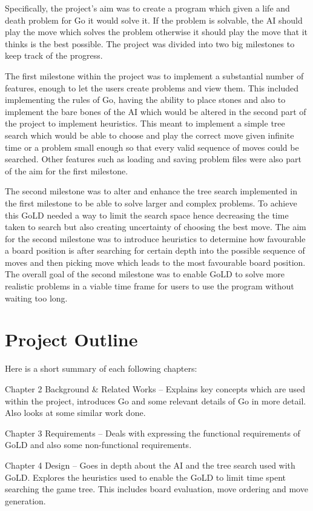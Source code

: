 \documentclass{l4proj}
\begin{document}
Specifically, the project’s aim was to create a program which given a life and death problem for Go it would solve it. If the problem is solvable,  the AI should play the move which solves the problem otherwise it should play the move that it thinks is the best possible. The project was divided into two big milestones to keep track of the progress.

The first milestone within the project was to implement a substantial number of features, enough to let the users create problems and view them. This included implementing the rules of Go, having the ability to place stones and also to implement the bare bones of the AI which would be altered in the second part of the project to implement heuristics. This meant to implement a simple tree search which would be able to choose and play the correct move given infinite time or a problem small enough so that every valid sequence of moves could be searched. Other features such as loading and saving problem files were also part of the aim for the first milestone.

The second milestone was to alter and enhance the tree search implemented in the first milestone to be able to solve larger and complex problems. To achieve this GoLD needed a way to limit the search space hence decreasing the time taken to search but also creating uncertainty of choosing the best move. The aim for the second milestone was to introduce heuristics to determine how favourable a board position is after searching for certain depth into the possible sequence of moves and then picking move which leads to the most favourable board position. The overall goal of the second milestone was to enable GoLD to solve more realistic problems in a viable time frame for users to use the program without waiting too long.

\section{Project Outline}

Here is a short summary of each following chapters:

Chapter 2 Background \& Related Works – Explains key concepts which are used within the project, introduces Go and some relevant details of Go in more detail. Also looks at some similar work done.

Chapter 3 Requirements – Deals with expressing the functional requirements of GoLD and also some non-functional requirements.


Chapter 4 Design – Goes in depth about the AI and the tree search used with GoLD.  Explores the heuristics used to enable the GoLD to limit time spent searching the game tree. This includes board evaluation, move ordering and move generation.
\end{document}

